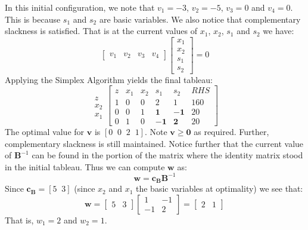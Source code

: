 \begin{example}
In this initial configuration, we note that $v_1 = -3$, $v_2 = -5$, $v_3 = 0$ and $v_4 = 0$. This is because $s_1$ and $s_2$ are basic variables. We also notice that complementary slackness is satisfied. That is at the current values of $x_1$, $x_2$, $s_1$ and $s_2$ we have:
\begin{displaymath}
\begin{bmatrix}v_1 & v_2 & v_3 & v_4\end{bmatrix}
\begin{bmatrix}x_1 \\ x_2 \\ s_1 \\ s_2\end{bmatrix} = 0
\end{displaymath}
Applying the Simplex Algorithm yields the final tableau:
\begin{displaymath}
\begin{array}{c}
\\
z\\x_2\\x_1
\end{array}
\left[\begin{array}{c|cccc|c}
z & 	x_1 &	x_2 & 	s_1 &	s_2 & 	RHS\\
\hline
1 & 	0 & 	0 & 	2 & 	1 & 	160\\
\hline
0 &  	0 & 	1 & 	\mathbf{1} & 	\mathbf{-1} & 	20\\
0 & 	1 & 	0 & 	\mathbf{-1} & 	\mathbf{2} & 	20
\end{array}\right]
\end{displaymath}
The optimal value for $\mathbf{v}$ is $[0\;\;0\;\;2\;\;1]$. Note $\mathbf{v} \geq \mathbf{0}$ as required. Further, complementary slackness is still maintained. Notice further that the current value of $\mathbf{B}^{-1}$ can be found in the portion of the matrix where the identity matrix stood in the initial tableau. Thus we can compute $\mathbf{w}$ as:
\begin{displaymath}
\mathbf{w} = \mathbf{c}_\mathbf{B}\mathbf{B}^{-1}
\end{displaymath}
Since $\mathbf{c}_\mathbf{B} = [5\;\;3]$ (since $x_2$ and $x_1$ the basic variables at optimality) we see that:
\begin{displaymath}
\mathbf{w} = \begin{bmatrix}5 & 3\end{bmatrix}
\begin{bmatrix}
1 & 	-1\\
-1 & 	2
\end{bmatrix} = \begin{bmatrix}2 & 1\end{bmatrix}
\end{displaymath}
That is, $w_1 = 2$ and $w_2 = 1$. 


\end{example}

